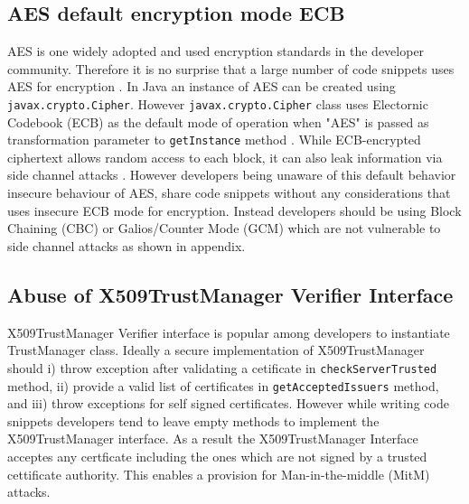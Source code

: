 
\subsection{AES default encryption mode ECB }
AES is one widely adopted and used encryption standards in the developer community. Therefore it is no surprise that a large number of code snippets uses AES for encryption . In Java an instance of AES can be created using \texttt{javax.crypto.Cipher}. However \texttt{javax.crypto.Cipher} class uses Electornic Codebook (ECB) as the default mode of operation when  "AES" is passed as transformation parameter to \texttt{getInstance} method . While ECB-encrypted ciphertext allows random access to each block, it can also leak information via side channel attacks . However developers being unaware of this default behavior insecure behaviour of AES, share code snippets without any considerations that uses insecure ECB mode for encryption. Instead developers should be using Block Chaining (CBC) or Galios/Counter Mode (GCM) which are not vulnerable to side channel attacks as shown in appendix.

\subsection{Abuse of X509TrustManager Verifier Interface}
X509TrustManager Verifier interface is popular among developers to instantiate TrustManager class. Ideally a secure implementation of X509TrustManager should i) throw exception after validating a cetificate in \texttt{checkServerTrusted} method, ii) provide a valid list of certificates in \texttt{getAcceptedIssuers} method, and iii) throw exceptions for self signed certificates. However while writing code snippets developers tend to leave empty methods to implement  the X509TrustManager interface. As a result the X509TrustManager Interface acceptes any certficate including the ones which are not signed by a trusted cettificate authority. This enables a provision for Man-in-the-middle (MitM) attacks.  

